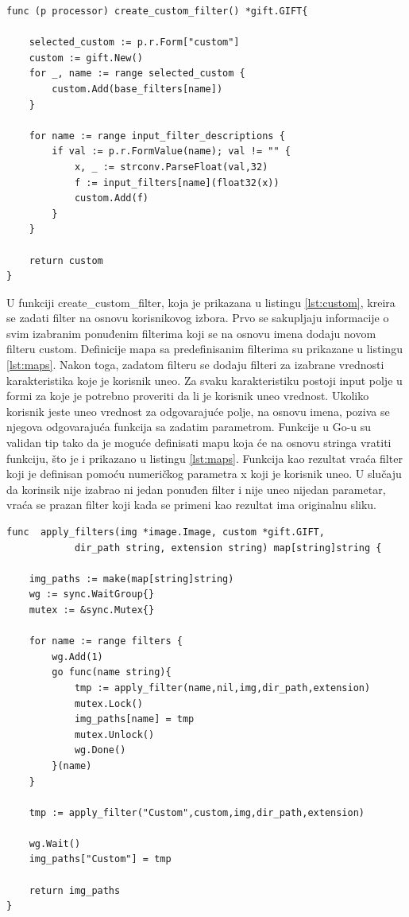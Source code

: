 \documentclass[12pt,oneside]{memoir}
\begin{document}
\begin{center}
\begin{lstlisting}[caption=Funkcija za kreiranje zadatog filtera,label={lst:custom}, backgroundcolor=\color{background}]
func (p processor) create_custom_filter() *gift.GIFT{

	selected_custom := p.r.Form["custom"]
	custom := gift.New()
	for _, name := range selected_custom {
		custom.Add(base_filters[name])
	}

	for name := range input_filter_descriptions {
		if val := p.r.FormValue(name); val != "" {
			x, _ := strconv.ParseFloat(val,32)
			f := input_filters[name](float32(x))
			custom.Add(f)
		}
	}

	return custom
}
\end{lstlisting}
\end{center}

 U funkciji create\_custom\_filter, koja je prikazana u listingu \ref{lst:custom}, kreira se zadati filter na osnovu korisnikovog izbora. Prvo se sakupljaju informacije o svim izabranim ponuđenim filterima koji se na osnovu imena dodaju novom filteru custom. Definicije mapa sa predefinisanim filterima su prikazane u listingu \ref{lst:maps}. Nakon toga, zadatom filteru se dodaju filteri za izabrane vrednosti karakteristika koje je korisnik uneo. Za svaku karakteristiku postoji input polje u formi za koje je potrebno proveriti da li je korisnik uneo vrednost. Ukoliko korisnik jeste uneo vrednost za odgovarajuće polje, na osnovu imena, poziva se njegova odgovarajuća funkcija sa zadatim parametrom. Funkcije u Go-u su validan tip tako da je moguće definisati mapu koja će na osnovu stringa vratiti funkciju, što je i prikazano u listingu \ref{lst:maps}. Funkcija kao rezultat vraća filter koji je definisan pomoću numeričkog parametra x koji je korisnik uneo. U slučaju da korinsik nije izabrao ni jedan ponuđen filter i nije uneo nijedan parametar, vraća se prazan filter koji kada se primeni kao rezultat ima originalnu sliku.

\begin{center}
\begin{lstlisting}[caption=Funkcija za paralelnu primenu filtera,label={lst:apply},  backgroundcolor=\color{background}]
func  apply_filters(img *image.Image, custom *gift.GIFT, 
			dir_path string, extension string) map[string]string {

	img_paths := make(map[string]string)
	wg := sync.WaitGroup{}
	mutex := &sync.Mutex{}

	for name := range filters {
		wg.Add(1)
		go func(name string){
			tmp := apply_filter(name,nil,img,dir_path,extension)
			mutex.Lock()
			img_paths[name] = tmp
			mutex.Unlock()
			wg.Done()
		}(name)
	}

	tmp := apply_filter("Custom",custom,img,dir_path,extension)

	wg.Wait()
	img_paths["Custom"] = tmp

	return img_paths
}
\end{lstlisting}
\end{center}
\end{document}
